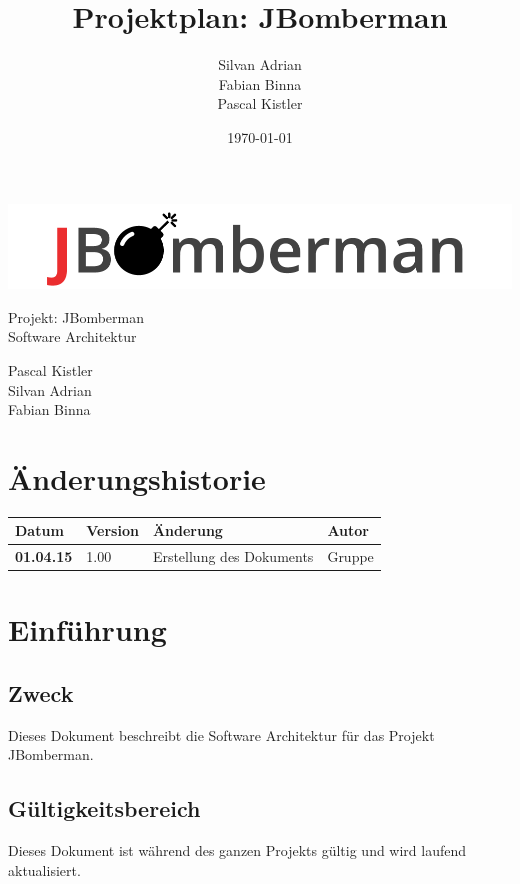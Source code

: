 \documentclass[11pt]{scrartcl}
\title{Projektplan: JBomberman}
\author{Silvan Adrian \\ Fabian Binna \\ Pascal Kistler}
\date{\today{}}
\begin{document}
\def\arraystretch{1.5}
\begin{titlepage}
\begin{center}
\vspace{10em}
\includegraphics[scale=2]{jbomberman}
\vspace{10em}
\end{center}
\begin{center}
\huge {Projekt: JBomberman} \\
\huge {Software Architektur}
\end{center}
\begin{center}
\vspace{10em}
\LARGE {Pascal Kistler} \\
\LARGE {Silvan Adrian} \\
\LARGE {Fabian Binna}
\end{center}

\end{titlepage}

\newpage
\section{Änderungshistorie}
\label{sec:Änderungen}

\begin{tabularx}{\linewidth}{l l l l}
\textbf{Datum} & \textbf{Version} & \textbf{Änderung}  & \textbf{Autor} \\
\hline
\textbf{01.04.15} & 1.00 & Erstellung des Dokuments & Gruppe \\
\end{tabularx}

\newpage
\tableofcontents
\newpage

\section{Einführung}
\subsection{Zweck}
Dieses Dokument beschreibt die Software Architektur für das Projekt JBomberman.
\subsection{Gültigkeitsbereich}
Dieses Dokument ist während des ganzen Projekts gültig und wird laufend aktualisiert.
\end{document}

